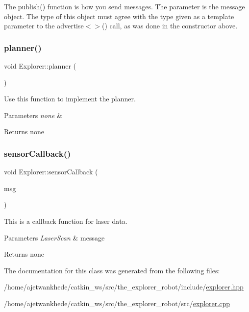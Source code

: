 The publish() function is how you send messages. The parameter is the message object. The type of this object must agree with the type given as a template parameter to the advertise$<$$>$() call, as was done in the constructor above.\mbox{\label{classExplorer_a14789aaaa077a3b9463b1bc9ff4ca693}} 
\subsubsection{\texorpdfstring{planner()}{planner()}}
{\footnotesize\ttfamily void Explorer\+::planner (\begin{DoxyParamCaption}{ }\end{DoxyParamCaption})}



Use this function to implement the planner. 


\begin{DoxyParams}{Parameters}
{\em none} & \\
\hline
\end{DoxyParams}
\begin{DoxyReturn}{Returns}
none 
\end{DoxyReturn}
\mbox{\label{classExplorer_a99a6215e70f2449189b0a3cb7ec12994}} 
\subsubsection{\texorpdfstring{sensor\+Callback()}{sensorCallback()}}
{\footnotesize\ttfamily void Explorer\+::sensor\+Callback (\begin{DoxyParamCaption}\item[{const sensor\+\_\+msgs\+::\+Laser\+Scan\+::\+Const\+Ptr \&}]{msg }\end{DoxyParamCaption})}



This is a callback function for laser data. 


\begin{DoxyParams}{Parameters}
{\em Laser\+Scan} & message\\
\hline
\end{DoxyParams}
\begin{DoxyReturn}{Returns}
none 
\end{DoxyReturn}


The documentation for this class was generated from the following files\+:\begin{DoxyCompactItemize}
\item 
/home/ajetwankhede/catkin\+\_\+ws/src/the\+\_\+explorer\+\_\+robot/include/\mbox{\hyperlink{explorer_8hpp}{explorer.\+hpp}}\item 
/home/ajetwankhede/catkin\+\_\+ws/src/the\+\_\+explorer\+\_\+robot/src/\mbox{\hyperlink{explorer_8cpp}{explorer.\+cpp}}\end{DoxyCompactItemize}
